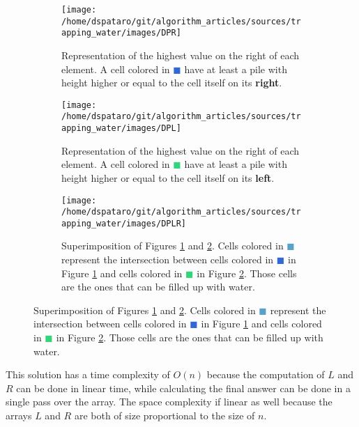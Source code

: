 \begin{figure}
\centering
\begin{subfigure}[b]{0.95\textwidth}
   \texttt{[image: /home/dspataro/git/algorithm\_articles/sources/trapping\_water/images/DPR]}
   \caption{Representation of the highest value on the right of each element. A cell colored in \textcolor[HTML]{3268d5}{$\blacksquare$} have at least a pile with height higher or equal to the cell itself on its \textbf{right}. }
   \label{fig:trapping_water_DPL}
\end{subfigure}

\begin{subfigure}[b]{0.95\textwidth}
   \texttt{[image: /home/dspataro/git/algorithm\_articles/sources/trapping\_water/images/DPL]}
   \caption{Representation of the highest value on the right of each element. A cell colored in \textcolor[HTML]{32d579}{$\blacksquare$} have at least a pile with height higher or equal to the cell itself on its \textbf{left}.}
   \label{fig:trapping_water_DPR}
\end{subfigure}

\begin{subfigure}[b]{0.95\textwidth}
   \texttt{[image: /home/dspataro/git/algorithm\_articles/sources/trapping\_water/images/DPLR]}
   \caption{Superimposition of Figures \ref{fig:trapping_water_DPL} and \ref{fig:trapping_water_DPR}. Cells colored in \textcolor[HTML]{5aa1c7}{$\blacksquare$} represent the intersection between cells colored in \textcolor[HTML]{3268d5}{$\blacksquare$} in Figure \ref{fig:trapping_water_DPL} and cells colored in \textcolor[HTML]{32d579}{$\blacksquare$} in Figure \ref{fig:trapping_water_DPR}. Those cells are the ones that can be filled up with water.}
   \label{fig:trapping_water_DPRL}
\end{subfigure}

\end{figure}




This solution has a time complexity of $O(n)$ because the computation of $L$ and $R$ can be done in linear time, while calculating the final answer can be done in a single pass over the array. The space complexity if linear as well because the arrays $L$ and $R$ are both of size proportional to the size of $n$.


